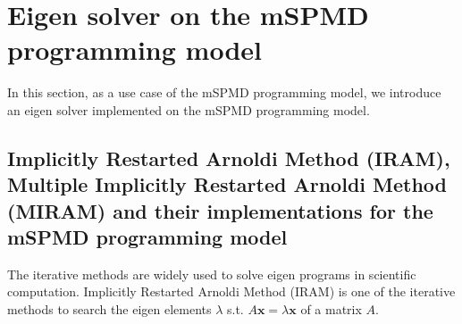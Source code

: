 \documentclass[graybox]{svmult}
\begin{document}
\section{Eigen solver on the mSPMD programming model}

In this section, as a use case of the mSPMD programming model, 
we introduce an eigen solver implemented on the mSPMD programming model. 

\subsection{Implicitly Restarted Arnoldi Method (IRAM), Multiple Implicitly Restarted Arnoldi Method (MIRAM) and their implementations for the mSPMD programming model} 

The iterative methods are widely used to solve eigen programs in scientific computation. 
Implicitly Restarted Arnoldi Method (IRAM) \cite{Sorensen-iram} is one of the iterative methods to search the eigen elements $\lambda$ s.t. $A \bm{x} = \lambda \bm{x} $ of a matrix $A$. 
\end{document}
